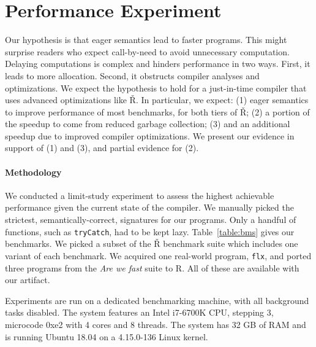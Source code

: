 \documentclass[review,creen,acmsmall]{acmart}
\renewcommand{\c}[1]{\lstinline |#1|\xspace}
\renewcommand{\Rsh}{{\sf\v R}\xspace}
\begin{document}
\section{Performance Experiment}\label{sec:rsh}

Our hypothesis is that eager semantics lead to faster programs. This might
surprise readers who expect call-by-need to avoid unnecessary computation.
Delaying computations is complex and hinders performance in two ways. First, it
leads to more allocation. Second, it obstructs compiler analyses and
optimizations. We expect the hypothesis to hold for a just-in-time compiler that
uses advanced optimizations like \Rsh. In particular, we expect: (1) eager
semantics to improve performance of most benchmarks, for both tiers of \Rsh; (2)
a portion of the speedup to come from reduced garbage collection; (3) and an
additional speedup due to improved compiler optimizations. We present our
evidence in support of (1) and (3), and partial evidence for (2).

\paragraph{Methodology}
We conducted a limit-study experiment to assess the highest achievable
performance given the current state of the compiler. We manually picked the
strictest, semantically-correct, signatures for our programs. Only a handful of
functions, such as \lstinline{tryCatch}, had to be kept lazy.
Table~\ref{table:bms} gives our benchmarks. We picked a subset of the \Rsh
benchmark suite which includes one variant of each benchmark. We acquired one
real-world program, \c{flx}, and ported three programs from the \emph{Are we
fast} suite to R. All of these are available with our artifact.

Experiments are run on a dedicated benchmarking machine, with all background
tasks disabled. The system features an Intel i7-6700K CPU, stepping 3, microcode
0xe2 with 4 cores and 8 threads. The system has 32 GB of RAM and is running
Ubuntu 18.04 on a 4.15.0-136 Linux kernel.
\end{document}
